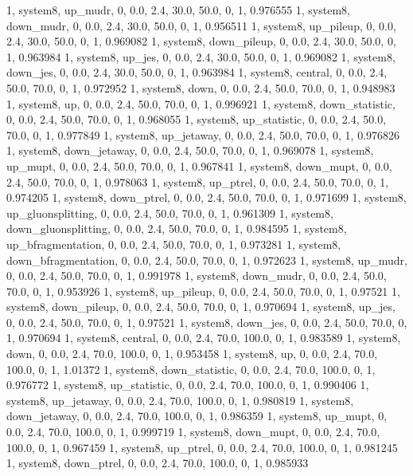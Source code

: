 1, system8, up_mudr,         0, 0.0, 2.4, 30.0, 50.0, 0, 1, 0.976555
1, system8, down_mudr,       0, 0.0, 2.4, 30.0, 50.0, 0, 1, 0.956511
1, system8, up_pileup,       0, 0.0, 2.4, 30.0, 50.0, 0, 1, 0.969082
1, system8, down_pileup,     0, 0.0, 2.4, 30.0, 50.0, 0, 1, 0.963984
1, system8, up_jes,          0, 0.0, 2.4, 30.0, 50.0, 0, 1, 0.969082
1, system8, down_jes,        0, 0.0, 2.4, 30.0, 50.0, 0, 1, 0.963984
1, system8, central,    0, 0.0, 2.4, 50.0, 70.0, 0, 1, 0.972952
1, system8, down,       0, 0.0, 2.4, 50.0, 70.0, 0, 1, 0.948983
1, system8, up,         0, 0.0, 2.4, 50.0, 70.0, 0, 1, 0.996921
1, system8, down_statistic,       0, 0.0, 2.4, 50.0, 70.0, 0, 1, 0.968055
1, system8, up_statistic,         0, 0.0, 2.4, 50.0, 70.0, 0, 1, 0.977849
1, system8, up_jetaway,      0, 0.0, 2.4, 50.0, 70.0, 0, 1, 0.976826
1, system8, down_jetaway,    0, 0.0, 2.4, 50.0, 70.0, 0, 1, 0.969078
1, system8, up_mupt,         0, 0.0, 2.4, 50.0, 70.0, 0, 1, 0.967841
1, system8, down_mupt,       0, 0.0, 2.4, 50.0, 70.0, 0, 1, 0.978063
1, system8, up_ptrel,        0, 0.0, 2.4, 50.0, 70.0, 0, 1, 0.974205
1, system8, down_ptrel,      0, 0.0, 2.4, 50.0, 70.0, 0, 1, 0.971699
1, system8, up_gluonsplitting, 0, 0.0, 2.4, 50.0, 70.0, 0, 1, 0.961309
1, system8, down_gluonsplitting, 0, 0.0, 2.4, 50.0, 70.0, 0, 1, 0.984595
1, system8, up_bfragmentation, 0, 0.0, 2.4, 50.0, 70.0, 0, 1, 0.973281
1, system8, down_bfragmentation, 0, 0.0, 2.4, 50.0, 70.0, 0, 1, 0.972623
1, system8, up_mudr,         0, 0.0, 2.4, 50.0, 70.0, 0, 1, 0.991978
1, system8, down_mudr,       0, 0.0, 2.4, 50.0, 70.0, 0, 1, 0.953926
1, system8, up_pileup,       0, 0.0, 2.4, 50.0, 70.0, 0, 1, 0.97521
1, system8, down_pileup,     0, 0.0, 2.4, 50.0, 70.0, 0, 1, 0.970694
1, system8, up_jes,          0, 0.0, 2.4, 50.0, 70.0, 0, 1, 0.97521
1, system8, down_jes,        0, 0.0, 2.4, 50.0, 70.0, 0, 1, 0.970694
1, system8, central,    0, 0.0, 2.4, 70.0, 100.0, 0, 1, 0.983589
1, system8, down,       0, 0.0, 2.4, 70.0, 100.0, 0, 1, 0.953458
1, system8, up,         0, 0.0, 2.4, 70.0, 100.0, 0, 1, 1.01372
1, system8, down_statistic,       0, 0.0, 2.4, 70.0, 100.0, 0, 1, 0.976772
1, system8, up_statistic,         0, 0.0, 2.4, 70.0, 100.0, 0, 1, 0.990406
1, system8, up_jetaway,      0, 0.0, 2.4, 70.0, 100.0, 0, 1, 0.980819
1, system8, down_jetaway,    0, 0.0, 2.4, 70.0, 100.0, 0, 1, 0.986359
1, system8, up_mupt,         0, 0.0, 2.4, 70.0, 100.0, 0, 1, 0.999719
1, system8, down_mupt,       0, 0.0, 2.4, 70.0, 100.0, 0, 1, 0.967459
1, system8, up_ptrel,        0, 0.0, 2.4, 70.0, 100.0, 0, 1, 0.981245
1, system8, down_ptrel,      0, 0.0, 2.4, 70.0, 100.0, 0, 1, 0.985933
